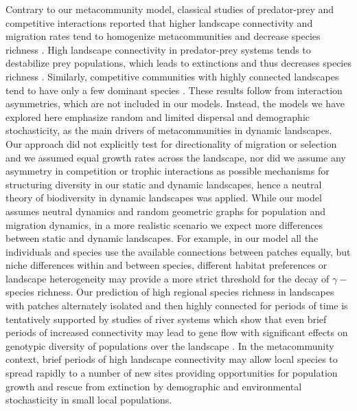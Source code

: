 \documentclass[a4paper,12pt]{article}
\begin{document}
Contrary to our metacommunity model, classical studies of predator-prey and competitive interactions reported that higher landscape connectivity and migration rates tend to homogenize metacommunities and decrease species richness \citep{ellneretal2001, foxetal2011}. High landscape connectivity in predator-prey systems tends to destabilize prey populations, which leads to extinctions and thus decreases species richness \citep{ellneretal2001, foxetal2011}. Similarly, competitive communities with highly connected landscapes tend to have only a few dominant species \citep{Holyoaketal2005}. These results follow from interaction asymmetries, which are not included in our models. Instead, the models we have explored here emphasize random and limited dispersal and demographic stochasticity, as the main drivers of metacommunities in dynamic landscapes. Our approach did not explicitly test for directionality of migration or selection and we assumed equal growth rates across the landscape, nor did we assume any asymmetry in competition or trophic interactions as possible mechanisms for structuring diversity in our static and dynamic landscapes, hence a neutral theory of biodiversity in dynamic landscapes was applied. While our model assumes neutral dynamics and random geometric graphs for population and migration dynamics, in a more realistic scenario we expect more differences between static and dynamic landscapes. For example, in our model all the individuals and species use the available connections between patches equally, but niche differences within and between species, different habitat preferences or landscape heterogeneity may provide a more strict threshold for the decay of $\gamma-$species richness. Our prediction of high regional species richness in landscapes with patches alternately isolated and then highly connected for periods of time is tentatively supported by studies of river systems which show that even brief periods of increased connectivity may lead to gene flow with significant effects on genotypic diversity of populations over the landscape \citep{BoizardEtAl2009}. In the metacommunity context, brief periods of high landscape connectivity may allow local species to spread rapidly to a number of new sites providing opportunities for population growth and rescue from extinction by demographic and environmental stochasticity in small local populations.
\end{document}
